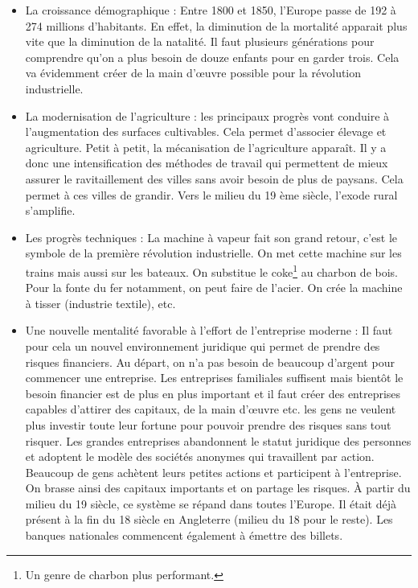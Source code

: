 \documentclass[12pt]{report}
\begin{document}
\begin{itemize}
\item La croissance démographique : Entre 1800 et 1850, l’Europe passe de 192 à 274
millions d’habitants. En effet, la diminution de la mortalité apparait plus vite que la
diminution de la natalité. Il faut plusieurs générations pour comprendre qu’on a plus
besoin de douze enfants pour en garder trois. Cela va évidemment créer de la main
d’œuvre possible pour la révolution industrielle.
\item La modernisation de l’agriculture : les principaux progrès vont conduire à
l’augmentation des surfaces cultivables. Cela permet d’associer élevage et agriculture. 
Petit à petit, la mécanisation de l’agriculture apparaît. Il y a donc une
intensification des méthodes de travail qui permettent de mieux assurer le
ravitaillement des villes sans avoir besoin de plus de paysans. Cela permet à ces
villes de grandir. Vers le milieu du 19 ème siècle, l’exode rural s’amplifie.
\item Les progrès techniques : La machine à vapeur fait son grand retour, c’est le symbole
de la première révolution industrielle. On met cette machine sur les trains mais aussi
sur les bateaux. On substitue le coke\footnote{Un genre de charbon plus performant.} au charbon de bois. Pour la fonte du fer
notamment, on peut faire de l’acier. On crée la machine à tisser (industrie textile), etc.
\item Une nouvelle mentalité favorable à l’effort de l’entreprise moderne : Il faut pour
cela un nouvel environnement juridique qui permet de prendre des risques financiers.
Au départ, on n’a pas besoin de beaucoup d’argent pour commencer une entreprise.
Les entreprises familiales suffisent mais bientôt le besoin financier est de plus en plus
important et il faut créer des entreprises capables d’attirer des capitaux, de la main
d’œuvre etc. les gens ne veulent plus investir toute leur fortune pour pouvoir prendre
des risques sans tout risquer. Les grandes entreprises abandonnent le statut juridique
des personnes et adoptent le modèle des sociétés anonymes qui travaillent par action.
Beaucoup de gens achètent leurs petites actions et participent à l’entreprise. On brasse
ainsi des capitaux importants et on partage les risques. À partir du milieu du 19 
siècle, ce système se répand dans toutes l’Europe. Il était déjà présent à la fin du 18 
siècle en Angleterre (milieu du 18 pour le reste). Les banques nationales commencent
également à émettre des billets.
\end{itemize}
\end{document}
